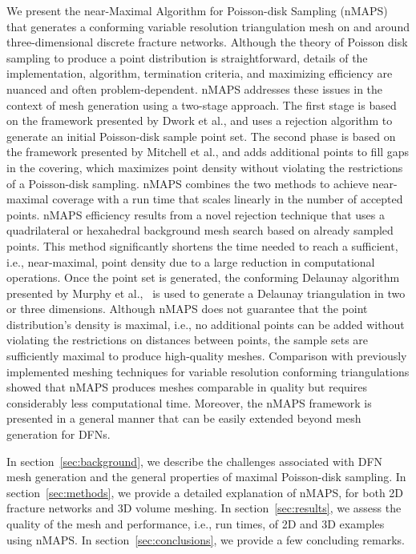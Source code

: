\documentclass[preprint, 10pt]{elsarticle}
\theoremstyle{definition}
\theoremstyle{remark}
\begin{document}
We present the near-Maximal Algorithm for Poisson-disk Sampling (nMAPS) that generates a conforming variable resolution triangulation mesh on and around three-dimensional discrete fracture networks.  
Although the theory of Poisson disk sampling to produce a point distribution is straightforward, details of the implementation, algorithm, termination criteria, and maximizing efficiency are nuanced and often problem-dependent. 
nMAPS addresses these issues in the context of mesh generation using a two-stage approach. 
The first stage is based on the framework presented by Dwork et al., \cite{fastvar} and uses a rejection algorithm to generate an initial Poisson-disk sample point set.
The second phase is based on the framework presented by Mitchell et al., \cite{varrad} and adds additional points to fill gaps in the covering, which maximizes point density without violating the restrictions of a Poisson-disk sampling.
nMAPS combines the two methods to achieve near-maximal coverage with a run time that scales linearly in the number of accepted points.
nMAPS efficiency results from a novel rejection technique that uses a quadrilateral or hexahedral background mesh search based on already sampled points.
This method significantly shortens the time needed to reach a sufficient, i.e., near-maximal, point density due to a large reduction in computational operations.
Once the point set is generated, the conforming Delaunay algorithm presented by Murphy et al.,~\cite{murphy2001point} is used to generate a Delaunay triangulation in two or three dimensions. 
Although nMAPS does not guarantee that the point distribution's density is maximal, i.e., no additional points can be added without violating the restrictions on distances between points, the sample sets are sufficiently maximal to produce high-quality meshes.
Comparison with previously implemented meshing techniques for variable resolution conforming triangulations showed that nMAPS produces meshes comparable in quality but requires considerably less computational time.  
Moreover, the nMAPS framework is presented in a general manner that can be easily extended beyond mesh generation for DFNs. 

In section~\ref{sec:background}, we describe the challenges associated with DFN mesh generation and the general properties of maximal Poisson-disk sampling. 
In section~\ref{sec:methods}, we provide a detailed explanation of nMAPS, for both 2D fracture networks and 3D volume meshing. 
In section~\ref{sec:results}, we assess the quality of the mesh and performance, i.e., run times, of 2D and 3D examples using nMAPS.
In section~\ref{sec:conclusions}, we provide a few concluding remarks.
\end{document}
